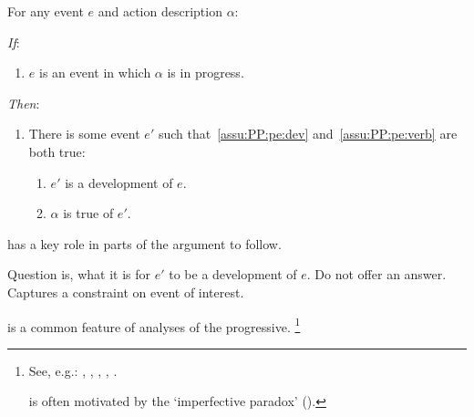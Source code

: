 \begin{note}
  \begin{assumption}[\assuPP{2}]%
    \label{assu:PP}%
    For any event \(e\) and action description \(\alpha\):
    \begin{itenum}
    \item[\emph{If}:]
      \begin{enumerate}[label=\alph*., ref=(\alph*)]
      \item
        \(e\) is an event in which \(\alpha\) is in progress.
      \end{enumerate}
    \item[\emph{Then}:]
      \begin{enumerate}[label=\alph*., ref=(\alph*), resume]
      \item
        There is some  event \(e'\) such that~\ref{assu:PP:pe:dev} and~\ref{assu:PP:pe:verb} are both true:
        \begin{enumerate}[label=\roman*., ref=(\roman*)]
        \item
          \label{assu:PP:pe:dev}
          \(e'\) is a development of \(e\).
        \item
          \label{assu:PP:pe:verb}
          \(\alpha\) is true of \(e'\).
        \end{enumerate}
      \end{enumerate}
    \end{itenum}
    \vspace{-\baselineskip}
  \end{assumption}

  \assuPP{} has a key role in parts of the argument to follow.

  Question is, what it is for \(e'\) to be a development of \(e\).
  Do not offer an answer.
  Captures a constraint on  event of interest.


   is a common feature of analyses of the progressive.%
  \footnote{
    See, e.g.:
    \cite{Bennett:1972uw},
    \cite{Dowty:1979vq},
    \cite{Parsons:1990aa},
    \cite{Landman:1992wh},
    \cite{Portner:1998um}.

    \assuPP{} is often motivated by the `imperfective paradox' (\cite[cf.][Ch.3.1]{Dowty:1979vq}).

}
\end{note}
